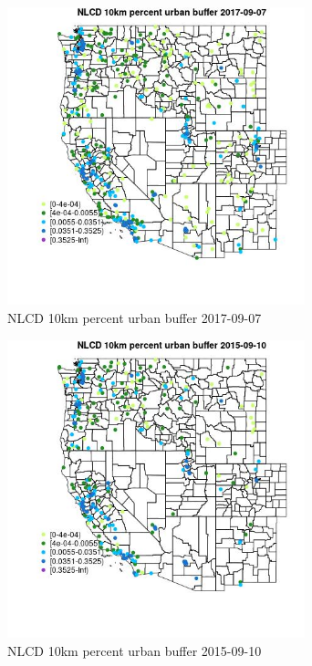 \begin{figure} 
\centering  
\includegraphics[width=0.77\textwidth]{Code_Outputs/Report_ML_input_PM25_Step4_part_e_de_duplicated_aves_compiled_2019-05-20wNAs_MapObsNLCD_10km_percent_urban_buffer2017-09-07.jpg} 
\caption{\label{fig:Report_ML_input_PM25_Step4_part_e_de_duplicated_aves_compiled_2019-05-20wNAsMapObsNLCD_10km_percent_urban_buffer2017-09-07}NLCD 10km percent urban buffer 2017-09-07} 
\end{figure} 
 

\begin{figure} 
\centering  
\includegraphics[width=0.77\textwidth]{Code_Outputs/Report_ML_input_PM25_Step4_part_e_de_duplicated_aves_compiled_2019-05-20wNAs_MapObsNLCD_10km_percent_urban_buffer2015-09-10.jpg} 
\caption{\label{fig:Report_ML_input_PM25_Step4_part_e_de_duplicated_aves_compiled_2019-05-20wNAsMapObsNLCD_10km_percent_urban_buffer2015-09-10}NLCD 10km percent urban buffer 2015-09-10} 
\end{figure} 
 

